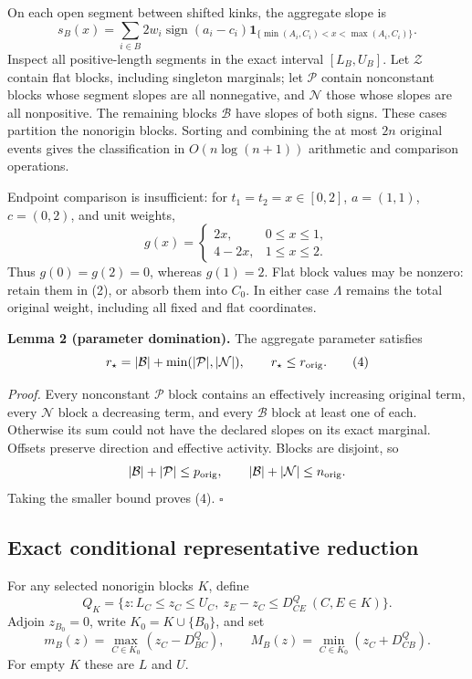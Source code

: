 On each open segment between shifted kinks, the aggregate slope is
\[
 s_B(x)=\sum_{i\in B}2w_i\operatorname{sign}(a_i-c_i)
  \mathbf{1}_{\{\min(A_i,C_i)<x<\max(A_i,C_i)\}}.     \tag{3}
\]
Inspect all positive-length segments in the exact interval
\([L_B,U_B]\). Let \(\mathcal Z\) contain flat blocks, including
singleton marginals; let \(\mathcal P\) contain nonconstant blocks
whose segment slopes are all nonnegative, and \(\mathcal N\) those
whose slopes are all nonpositive. The remaining blocks
\(\mathcal B\) have slopes of both signs. These cases partition the
nonorigin blocks. Sorting and combining the at most \(2n\) original
events gives the classification in \(O(n\log(n+1))\) arithmetic and
comparison operations.

Endpoint comparison is insufficient: for \(t_1=t_2=x\in[0,2]\),
\(a=(1,1)\), \(c=(0,2)\), and unit weights,
\[
 g(x)=
 \begin{cases}2x,&0\le x\le1,\\4-2x,&1\le x\le2.\end{cases}
\]
Thus \(g(0)=g(2)=0\), whereas \(g(1)=2\).
Flat block values may be nonzero: retain them in (2), or absorb them
into \(C_0\). In either case \(\Lambda\) remains the total original
weight, including all fixed and flat coordinates.

\noindent\textbf{Lemma 2 (parameter domination).}
The aggregate parameter satisfies
\[
 r_\star=|\mathcal B|+\min(|\mathcal P|,|\mathcal N|),
 \qquad r_\star\le r_{\rm orig}.                    \tag{4}
\]

\noindent\emph{Proof.}
Every nonconstant \(\mathcal P\) block contains an effectively
increasing original term, every \(\mathcal N\) block a decreasing
term, and every \(\mathcal B\) block at least one of each.
Otherwise its sum could not have the declared slopes on its exact
marginal. Offsets preserve direction and effective activity.
Blocks are disjoint, so
\[
 |\mathcal B|+|\mathcal P|\le p_{\rm orig},\qquad
 |\mathcal B|+|\mathcal N|\le n_{\rm orig}.
\]
Taking the smaller bound proves (4). \(\square\)

\subsection{Exact conditional representative reduction}

For any selected nonorigin blocks \(K\), define
\[
 Q_K=\{z:L_C\le z_C\le U_C,\
              z_E-z_C\le D^Q_{CE}\ (C,E\in K)\}.
\]
Adjoin \(z_{B_0}=0\), write \(K_0=K\cup\{B_0\}\), and set
\[
 m_B(z)=\max_{C\in K_0}(z_C-D^Q_{BC}),\qquad
 M_B(z)=\min_{C\in K_0}(z_C+D^Q_{CB}).               \tag{5}
\]
For empty \(K\) these are \(L\) and \(U\).

